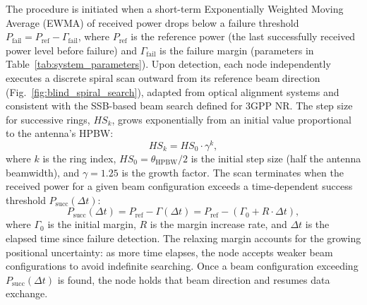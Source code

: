 \documentclass[fleqn,10pt]{wlscirep}
\newcommand{\rev}[1]{#1}
\begin{document}
The procedure is initiated when a short-term Exponentially Weighted Moving Average (EWMA) of received power drops below a failure threshold $P_{\text{fail}} = P_{\text{ref}} - \Gamma_{\text{fail}}$, where $P_{\text{ref}}$ is the reference power (the last successfully received power level before failure) and $\Gamma_{\text{fail}}$ is the failure margin (parameters in Table~\ref{tab:system_parameters}). Upon detection, each node independently executes a discrete spiral scan outward from its reference beam direction (Fig.~\ref{fig:blind_spiral_search}), adapted from optical alignment systems\cite{photonics11060540} \rev{and consistent with the SSB-based beam search defined for 3GPP NR\cite{Giordani2018ATO, Heng2021SixChallenges}}. The step size for successive rings, $HS_k$, grows exponentially from an initial value proportional to the antenna's HPBW:
\begin{equation}
    HS_k = HS_0 \cdot \gamma^k,
\end{equation}
where $k$ is the ring index, $HS_0 = \theta_{\text{HPBW}}/2$ is the initial step size (half the antenna beamwidth), and $\gamma = 1.25$ is the growth factor. The scan terminates when the received power for a given beam configuration exceeds a time-dependent success threshold $P_{\text{succ}}(\Delta t)$:
\begin{equation}
    P_{\text{succ}}(\Delta t) = P_{\text{ref}} - \Gamma(\Delta t) = P_{\text{ref}} - (\Gamma_{0} + R \cdot \Delta t),
\end{equation}
where $\Gamma_{0}$ is the initial margin, $R$ is the margin increase rate, and $\Delta t$ is the elapsed time since failure detection. The relaxing margin accounts for the growing positional uncertainty: as more time elapses, the node accepts weaker beam configurations to avoid indefinite searching. Once a beam configuration exceeding $P_{\text{succ}}(\Delta t)$ is found, the node holds that beam direction and resumes data exchange.
\end{document}
